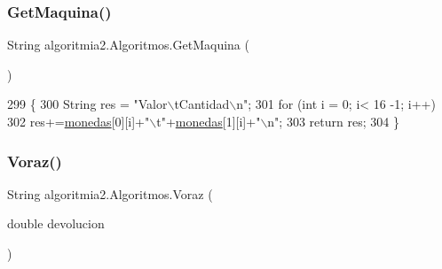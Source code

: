 \subsubsection{\texorpdfstring{Get\+Maquina()}{GetMaquina()}}
{\footnotesize\ttfamily String algoritmia2.\+Algoritmos.\+Get\+Maquina (\begin{DoxyParamCaption}{ }\end{DoxyParamCaption})\hspace{0.3cm}{\ttfamily [inline]}}


\begin{DoxyCode}
299     \{
300         String res = \textcolor{stringliteral}{"Valor\(\backslash\)tCantidad\(\backslash\)n"};
301         \textcolor{keywordflow}{for} (\textcolor{keywordtype}{int} i = 0; i< 16 -1; i++)
302             res+=\mbox{\hyperlink{classalgoritmia2_1_1_algoritmos_a7c670acfc4ef3b85c2e6908773014a13}{monedas}}[0][i]+\textcolor{stringliteral}{"\(\backslash\)t"}+\mbox{\hyperlink{classalgoritmia2_1_1_algoritmos_a7c670acfc4ef3b85c2e6908773014a13}{monedas}}[1][i]+\textcolor{stringliteral}{"\(\backslash\)n"};
303         \textcolor{keywordflow}{return} res;
304     \}
\end{DoxyCode}
\mbox{\label{classalgoritmia2_1_1_algoritmos_a5bfcbe069e929caf3bfd11e8eedbda43}} 
\subsubsection{\texorpdfstring{Voraz()}{Voraz()}}
{\footnotesize\ttfamily String algoritmia2.\+Algoritmos.\+Voraz (\begin{DoxyParamCaption}\item[{double}]{devolucion }\end{DoxyParamCaption})\hspace{0.3cm}{\ttfamily [inline]}}


